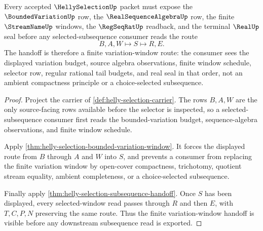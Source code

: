 \begin{theorem}\label{thm:helly-selection-finite-variation-window-handoff}
Every accepted $\HellySelectionUp$ packet must expose the $\BoundedVariationUp$ row, the $\RealSequenceAlgebraUp$ row, the finite $\StreamNameUp$ windows, the $\RegSeqRatUp$ readback, and the terminal $\RealUp$ seal before any selected-subsequence consumer reads the route
$$
B,A,W \longmapsto S \longmapsto R,E .
$$
The handoff is therefore a finite variation-window route: the consumer sees the displayed variation budget, source algebra observations, finite window schedule, selector row, regular rational tail budgets, and real seal in that order, not an ambient compactness principle or a choice-selected subsequence.
\end{theorem}
\begin{proof}
Project the carrier of \autoref{def:helly-selection-carrier}. The rows $B,A,W$ are the only source-facing rows available before the selector is inspected, so a selected-subsequence consumer first reads the bounded-variation budget, sequence-algebra observations, and finite window schedule.

Apply \autoref{thm:helly-selection-bounded-variation-window}. It forces the displayed route from $B$ through $A$ and $W$ into $S$, and prevents a consumer from replacing the finite variation window by open-cover compactness, trichotomy, quotient stream equality, ambient completeness, or a choice-selected subsequence.

Finally apply \autoref{thm:helly-selection-subsequence-handoff}. Once $S$ has been displayed, every selected-window read passes through $R$ and then $E$, with $T,C,P,N$ preserving the same route. Thus the finite variation-window handoff is visible before any downstream subsequence read is exported.
\end{proof}

